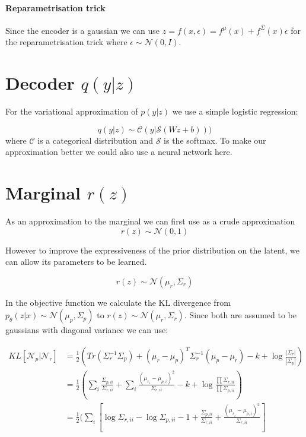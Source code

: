 \documentclass[10pt,oneside,openright]{report}
\begin{document}
\paragraph{Reparametrisation trick}
Since the encoder is a gaussian we can use  $z = f(x, \epsilon) =  f^\mu(x) + f^\Sigma(x) \epsilon$ for the reparametrisation trick where $\epsilon \sim \mathcal{N}(0, I)$. 
 
\section{Decoder $q(y|z)$}
For the variational approximation of $p(y|z)$ we use a simple logistic regression:

$$ q(y|z) \sim \mathcal{C}(y| \mathcal{S}(Wz + b)))$$ where $\mathcal{C}$ is a categorical distribution and $\mathcal{S}$ is the softmax. To make our approximation better we could also use a neural network here. 

\section{Marginal $r(z)$}

As an approximation to the marginal we can first use as a crude approximation 
$$r(z) \sim \mathcal{N}(0, 1)$$

However to improve the expressiveness of the prior distribution on the latent, we can allow its parameters to be learned. 

$$r(z) \sim \mathcal{N}(\mu_r, \Sigma_r)$$

In the objective function we calculate the KL divergence from $p_\theta(z|x) \sim \mathcal{N}(\mu_p, \Sigma_p)$ to $r(z) \sim \mathcal{N}(\mu_r, \Sigma_r)$. Since both are assumed to be gaussians with diagonal variance we can use:

\begin{align}
KL[\mathcal{N}_p| \mathcal{N}_r] &= \frac{1}{2}(Tr(\Sigma_r^{-1}\Sigma_p) + (\mu_r - \mu_p)^T\Sigma_r^{-1}(\mu_p - \mu_r) - k + \log\frac{|\Sigma_r|}{|\Sigma_p|})\\
&= \frac{1}{2}(\sum_i \frac{\Sigma_{p, ii}}{\Sigma_{r, ii}} + \sum_i \frac{(\mu_{r_i} - \mu_{p, i})^2}{\Sigma_{r, ii}} - k + \log\frac{\prod \Sigma_{r, ii}}{\prod \Sigma_{p, ii}})\\
&= \frac{1}{2}(\sum_i[ \log \Sigma_{r, ii} - \log \Sigma_{p, ii} - 1 + \frac{\Sigma_{p, ii}}{\Sigma_{r, ii}} + \frac{(\mu_{r_i} - \mu_{p, i})^2}{\Sigma_{r, ii}}]
\end{align}
\end{document}
